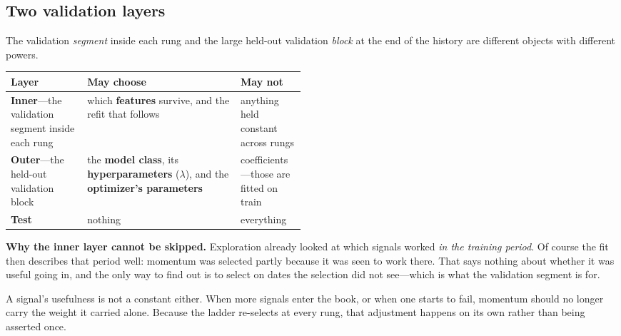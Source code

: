 \subsection{Two validation layers}\label{sec:two-layers}

The validation \emph{segment} inside each rung and the large held-out validation \emph{block} at
the end of the history are different objects with different powers.


\begin{tabularx}{\linewidth}{|>{\raggedright\arraybackslash}p{0.26\linewidth}|X|>{\raggedright\arraybackslash}p{0.22\linewidth}|}
\hline
\textbf{Layer} & \textbf{May choose} & \textbf{May not} \\ \hline
\textbf{Inner}---the validation segment inside each rung
  & which \textbf{features} survive, and the refit that follows
  & anything held constant across rungs \\ \hline
\textbf{Outer}---the held-out validation block
  & the \textbf{model class}, its \textbf{hyperparameters} ($\lambda$), and the
    \textbf{optimizer's parameters}
  & coefficients---those are fitted on train \\ \hline
\textbf{Test} & nothing & everything \\ \hline
\end{tabularx}

\textbf{Why the inner layer cannot be skipped.} Exploration already looked at which signals worked
\emph{in the training period}. Of course the fit then describes that period well: momentum was selected partly because it was seen to work
there. That says nothing about whether it was useful going in, and the only way to find out is to
select on dates the selection did not see---which is what the validation segment is for.

\begin{note}
A signal's usefulness is not a constant either. When more signals enter the book, or when one
starts to fail, momentum should no longer carry the weight it carried alone. Because the ladder
re-selects at every rung, that adjustment happens on its own rather than being asserted once.
\end{note}


